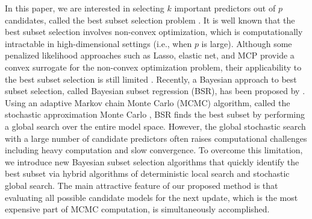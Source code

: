 \documentclass[12pt]{article}
\begin{document}
In this paper, we are interested in selecting $k$ important predictors out of $p$ candidates, called the best subset selection problem \citep{hocking1967selection}. It is well known that the best subset selection involves non-convex optimization, which is computationally intractable in high-dimensional settings (i.e., when $p$ is large). Although some penalized likelihood approaches such as Lasso, elastic net, and MCP provide a convex surrogate for the non-convex optimization problem, their applicability to the best subset selection is still limited \citep{bertsimas2016best}. Recently, a Bayesian approach to best subset selection, called Bayesian subset regression (BSR), has been proposed by \citet{liang2013bayesian}. Using an adaptive Markov chain Monte Carlo (MCMC) algorithm, called the stochastic approximation Monte Carlo \citep{liang2007stochastic}, BSR finds the best subset by performing a global search over the entire model space. However, the global stochastic search with a large number of candidate predictors often raises computational challenges including heavy computation and slow convergence. To overcome this limitation, we introduce new Bayesian subset selection algorithms that quickly identify the best subset via hybrid algorithms of deterministic local search and stochastic global search. The main attractive feature of our proposed method is that evaluating all possible candidate models for the next update, which is the most expensive part of MCMC computation, is simultaneously accomplished.

\end{document}

